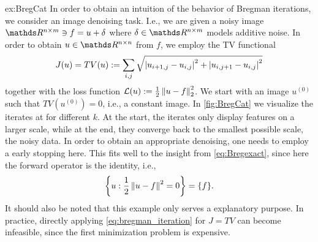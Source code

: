 \begin{example}{}{ex:BregCat}
In order to obtain an intuition of the behavior of Bregman iterations, we consider an image denoising task. I.e., we are given a noisy image $\R^{n\times m}\ni f = u + \delta$ where $\delta\in\R^{n\times m}$ models additive noise. In order to obtain $u\in\R^{n\times n}$ from $f$, we employ the TV functional \cite{rudin1992nonlinear} 
%
\begin{align*}
J(u) = TV(u) := \sum_{i,j} \sqrt{\left|u_{i+1, j} - u_{i,j}\right|^2 + \left|u_{i,j+1} - u_{i,j}\right|^2}
\end{align*}
%
together with the loss function $\mathcal{L}(u):= \frac{1}{2}\left\|u-f\right\|^2_2$.
%
We start with an image $u^{(0)}$ such that $TV(u^{(0)})=0$, i.e., a constant image. In \cref{fig:BregCat} we visualize the iterates at for different $k$. At the start, the iterates only display features on a larger scale, while at the end, they converge back to the smallest possible scale, the noisy data. In order to obtain an appropriate denoising, one needs to employ a early stopping here. This fits well to the insight from \cref{eq:Bregexact}, since here the forward operator is the identity, i.e.,
%
\begin{align*}
\left\{ u: \frac{1}{2}\left\|u-f\right\|^2=0\right\} = \{f\}. 
\end{align*}
%
It should also be noted that this example only serves a explanatory purpose. In practice, directly applying \cref{eq:bregman_iteration} for $J=TV$ can become infeasible, since the first minimization problem is expensive.
\end{example}%
%
%
%
%
